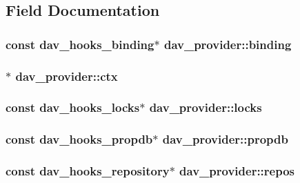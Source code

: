 \subsection{Field Documentation}
\subsubsection[{\texorpdfstring{binding}{binding}}]{\setlength{\rightskip}{0pt plus 5cm}const {\bf dav\+\_\+hooks\+\_\+binding}$\ast$ dav\+\_\+provider\+::binding}\hypertarget{structdav__provider_a8349a06cc576a4251c187391724a2217}{}\label{structdav__provider_a8349a06cc576a4251c187391724a2217}
\subsubsection[{\texorpdfstring{ctx}{ctx}}]{$\ast$ dav\+\_\+provider\+::ctx}\hypertarget{structdav__provider_a2f122d40843796bc93ab79eec8435f5d}{}\label{structdav__provider_a2f122d40843796bc93ab79eec8435f5d}
\subsubsection[{\texorpdfstring{locks}{locks}}]{\setlength{\rightskip}{0pt plus 5cm}const {\bf dav\+\_\+hooks\+\_\+locks}$\ast$ dav\+\_\+provider\+::locks}\hypertarget{structdav__provider_a25dbf8b437f20c68747156f045ccb9d0}{}\label{structdav__provider_a25dbf8b437f20c68747156f045ccb9d0}
\subsubsection[{\texorpdfstring{propdb}{propdb}}]{\setlength{\rightskip}{0pt plus 5cm}const {\bf dav\+\_\+hooks\+\_\+propdb}$\ast$ dav\+\_\+provider\+::propdb}\hypertarget{structdav__provider_a196a69ce923c4c3c6bef68180075cf74}{}\label{structdav__provider_a196a69ce923c4c3c6bef68180075cf74}
\subsubsection[{\texorpdfstring{repos}{repos}}]{\setlength{\rightskip}{0pt plus 5cm}const {\bf dav\+\_\+hooks\+\_\+repository}$\ast$ dav\+\_\+provider\+::repos}\hypertarget{structdav__provider_a61f6962558e1cb7758ea63347815a970}{}\label{structdav__provider_a61f6962558e1cb7758ea63347815a970}
